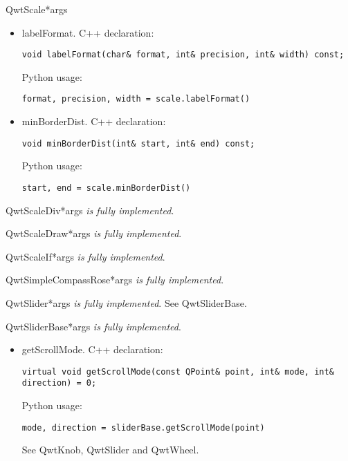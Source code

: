 \documentclass{manual}
\begin{document}
\begin{classdesc}{QwtScale}{*args}

  \begin{itemize}

    \item{labelFormat}. C++ declaration:
      \begin{verbatim}
void labelFormat(char& format, int& precision, int& width) const;
      \end{verbatim}
      Python usage:
      \begin{verbatim}
format, precision, width = scale.labelFormat()
      \end{verbatim}

    \item{minBorderDist}. C++ declaration:
      \begin{verbatim}
void minBorderDist(int& start, int& end) const;
      \end{verbatim}
      Python usage:
      \begin{verbatim}
start, end = scale.minBorderDist()
      \end{verbatim}

  \end{itemize}
\end{classdesc}

\begin{classdesc}{QwtScaleDiv}{*args}
\emph{is fully implemented}.
\end{classdesc}

\begin{classdesc}{QwtScaleDraw}{*args}
\emph{is fully implemented}.
\end{classdesc}

\begin{classdesc}{QwtScaleIf}{*args}
\emph{is fully implemented}.
\end{classdesc}

\begin{classdesc}{QwtSimpleCompassRose}{*args}
\emph{is fully implemented}.
\end{classdesc}

\begin{classdesc}{QwtSlider}{*args}
\emph{is fully implemented}. See QwtSliderBase.
\end{classdesc}

\begin{classdesc}{QwtSliderBase}{*args}
\emph{is fully implemented}.

  \begin{itemize}

    \item{getScrollMode}. C++ declaration:
      \begin{verbatim}
virtual void getScrollMode(const QPoint& point, int& mode, int& direction) = 0;
      \end{verbatim}
      Python usage:
      \begin{verbatim}
mode, direction = sliderBase.getScrollMode(point)
      \end{verbatim}
      See QwtKnob, QwtSlider and QwtWheel.

  \end{itemize}
\end{classdesc}
\end{document}
